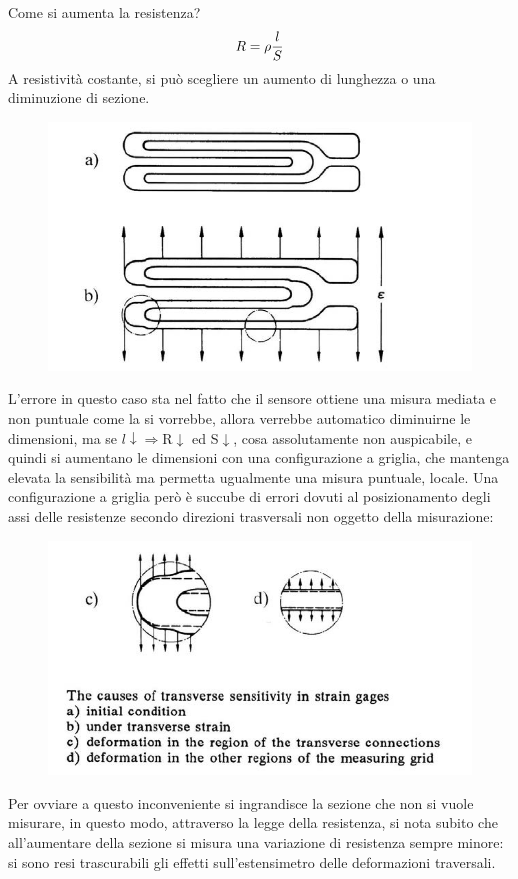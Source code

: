 \documentclass[a4paper, 15pt]{article}
\begin{document}
\begin{adjustwidth}{2in}{}
		Come si aumenta la resistenza? 
		\[R = \rho {l\over S}\]
		A resistività costante, si può scegliere un aumento di lunghezza o una diminuzione di sezione.
\begin{figure}[H]
	\centering
	\includegraphics[width=0.5\linewidth]{immagini/4}
\end{figure}
		L'errore in questo caso sta nel fatto che il sensore ottiene una misura mediata e non puntuale come la si vorrebbe, allora verrebbe automatico diminuirne le dimensioni, ma se $l\downarrow\Rightarrow$R$\downarrow$ ed S$\downarrow$, cosa assolutamente non auspicabile, e quindi si aumentano le dimensioni con una configurazione a griglia, che mantenga elevata la sensibilità ma permetta ugualmente una misura puntuale, locale. 
\newpage		
		Una configurazione a griglia però è succube di errori dovuti al posizionamento degli assi delle resistenze secondo direzioni trasversali non oggetto della misurazione: 
\begin{figure}[H]
	\centering
	\includegraphics[width=0.5\linewidth]{immagini/5}
\end{figure}
		Per ovviare a questo inconveniente si ingrandisce la sezione che non si vuole misurare, in questo modo, attraverso la legge della resistenza, si nota subito che all'aumentare della sezione si misura una variazione di resistenza sempre minore: si sono resi trascurabili gli effetti sull'estensimetro delle deformazioni traversali. 
\end{adjustwidth}
\end{document}
